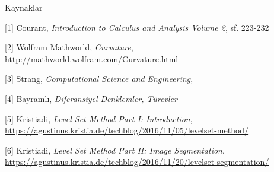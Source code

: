 \documentclass[12pt,fleqn]{article}\usepackage{../../common}
\begin{document}
Kaynaklar

[1] Courant, {\em Introduction to Calculus and Analysis Volume 2}, sf. 223-232

[2] Wolfram Mathworld, {\em Curvature}, \url{http://mathworld.wolfram.com/Curvature.html}

[3] Strang, {\em Computational Science and Engineering},

[4] Bayramlı, {\em Diferansiyel Denklemler, Türevler}

[5] Kristiadi, {\em Level Set Method Part I: Introduction},
    \url{https://agustinus.kristia.de/techblog/2016/11/05/levelset-method/}

[6] Kristiadi, {\em Level Set Method Part II: Image Segmentation},
    \url{https://agustinus.kristia.de/techblog/2016/11/20/levelset-segmentation/}
\end{document}
